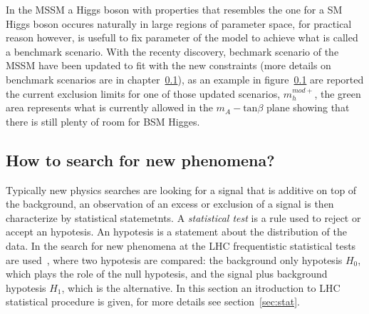 In the MSSM a Higgs boson with properties that  
resembles the one for a SM Higgs boson occures naturally in large regions 
of parameter space, for practical reason however,
is usefull to fix  parameter of the model to achieve what is called a benchmark
scenario. With the recenty discovery, bechmark scenario of the MSSM have been updated to fit
with the new constraints (more details on benchmark scenarios are in chapter~\ref{}), 
as an example in figure~\ref{} are reported the current exclusion limits
for one of those updated scenarios, $m_{h}^{mod+}$, the green area represents what is currently 
allowed in the $m_{A} - \text{tan}\beta$ plane showing that there is still plenty of room for BSM
Higges.

\subsection{How to search for new phenomena?} 
Typically new physics searches are looking for a signal 
that is additive on top of the background, an observation of an excess or exclusion of a signal
is then characterize by statistical statemetnts.  A \emph{statistical test}
is a rule used to reject or accept an hypotesis. An hypotesis is a statement about the distribution of the data.
In the search for new phenomena at the LHC frequentistic statistical tests are used~\cite{LHCstat},
where two hypotesis are compared:  the background only hypotesis $H_{0}$,
which plays the role of the null hypotesis, and the signal plus background hypotesis $H_{1}$, which is the alternative.
In this section an itroduction to LHC statistical procedure is given, for more details see section~\ref{sec:stat}.

